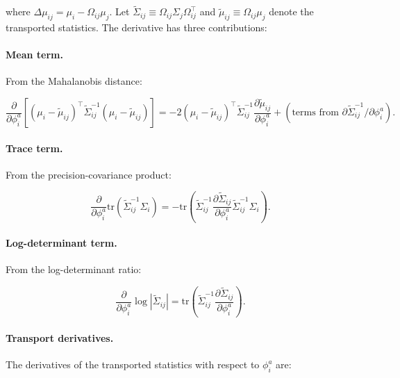 \documentclass[twoside,11pt]{article}
\begin{document}
where $\Delta\mu_{ij} = \mu_i - \Omega_{ij}\mu_j$. Let $\tilde{\Sigma}_{ij} \equiv \Omega_{ij}\Sigma_j\Omega_{ij}^\top$ and $\tilde{\mu}_{ij} \equiv \Omega_{ij}\mu_j$ denote the transported statistics. The derivative has three contributions:

\paragraph{Mean term.} From the Mahalanobis distance:

\begin{equation}
\frac{\partial}{\partial \phi_i^a}\left[(\mu_i - \tilde{\mu}_{ij})^\top \tilde{\Sigma}_{ij}^{-1}(\mu_i - \tilde{\mu}_{ij})\right]
= -2(\mu_i - \tilde{\mu}_{ij})^\top \tilde{\Sigma}_{ij}^{-1} \frac{\partial \tilde{\mu}_{ij}}{\partial \phi_i^a}
+ (\text{terms from } \partial\tilde{\Sigma}_{ij}^{-1}/\partial\phi_i^a).
\label{eq:mean_term_phi}
\end{equation}

\paragraph{Trace term.} From the precision-covariance product:

\begin{equation}
\frac{\partial}{\partial \phi_i^a}\mathrm{tr}(\tilde{\Sigma}_{ij}^{-1}\Sigma_i)
= -\mathrm{tr}\!\left(\tilde{\Sigma}_{ij}^{-1} \frac{\partial \tilde{\Sigma}_{ij}}{\partial \phi_i^a} \tilde{\Sigma}_{ij}^{-1} \Sigma_i\right).
\label{eq:trace_term_phi}
\end{equation}

\paragraph{Log-determinant term.} From the log-determinant ratio:

\begin{equation}
\frac{\partial}{\partial \phi_i^a}\log|\tilde{\Sigma}_{ij}|
= \mathrm{tr}\!\left(\tilde{\Sigma}_{ij}^{-1} \frac{\partial \tilde{\Sigma}_{ij}}{\partial \phi_i^a}\right).
\label{eq:logdet_term_phi}
\end{equation}

\paragraph{Transport derivatives.} The derivatives of the transported statistics with respect to $\phi_i^a$ are:
\end{document}
